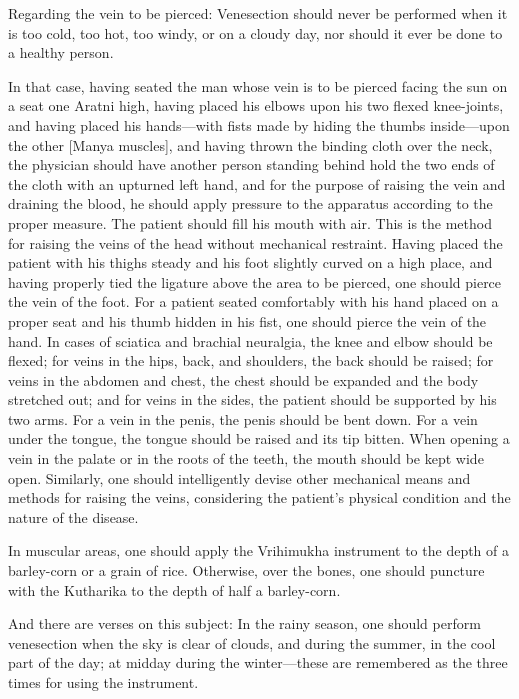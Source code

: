 \begin{translation}
\begin{tt}
\item[7]
Regarding the vein to be pierced: Venesection should never be performed when it is too cold, too hot, too windy, or on a cloudy day, nor should it ever be done to a healthy person.

\item[8]
In that case, having seated the man whose vein is to be pierced facing the sun on a seat one Aratni high, having placed his elbows upon his two flexed knee-joints, and having placed his hands—with fists made by hiding the thumbs inside—upon the other [Manya muscles], and having thrown the binding cloth over the neck, the physician should have another person standing behind hold the two ends of the cloth with an upturned left hand, and for the purpose of raising the vein and draining the blood, he should apply pressure to the apparatus according to the proper measure.
The patient should fill his mouth with air.
This is the method for raising the veins of the head without mechanical restraint.
Having placed the patient with his thighs steady and his foot slightly curved on a high place, and having properly tied the ligature above the area to be pierced, one should pierce the vein of the foot.
For a patient seated comfortably with his hand placed on a proper seat and his thumb hidden in his fist, one should pierce the vein of the hand.
In cases of sciatica and brachial neuralgia, the knee and elbow should be flexed; for veins in the hips, back, and shoulders, the back should be raised; for veins in the abdomen and chest, the chest should be expanded and the body stretched out; and for veins in the sides, the patient should be supported by his two arms.
For a vein in the penis, the penis should be bent down.
For a vein under the tongue, the tongue should be raised and its tip bitten.
When opening a vein in the palate or in the roots of the teeth, the mouth should be kept wide open.
Similarly, one should intelligently devise other mechanical means and methods for raising the veins, considering the patient's physical condition and the nature of the disease.

\item[9]
In muscular areas, one should apply the Vrihimukha instrument to the depth of a barley-corn or a grain of rice.
Otherwise, over the bones, one should puncture with the Kutharika to the depth of half a barley-corn.

\item[10]
And there are verses on this subject:
In the rainy season, one should perform venesection when the sky is clear of clouds, and during the summer, in the cool part of the day; at midday during the winter—these are remembered as the three times for using the instrument.



\end{tt}
\end{translation}
